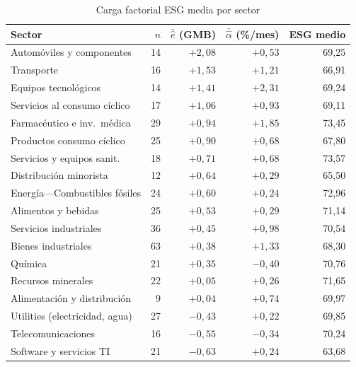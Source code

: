 \documentclass[12pt, a4paper]{article}
\begin{document}
\begin{table}[H]
  \centering
  \caption{Carga factorial ESG media por sector}
  \label{tab:sectores_e}
  \small
  \begin{tabular}{lrrrr}
    \toprule
    Sector & $n$ & $\bar{\hat{e}}$ (GMB) & $\bar{\hat\alpha}$ (\%/mes) & ESG medio \\
    \midrule
    Autom\'oviles y componentes       & 14 & $+2{,}08$ & $+0{,}53$ & 69,25 \\
    Transporte                         & 16 & $+1{,}53$ & $+1{,}21$ & 66,91 \\
    Equipos tecnol\'ogicos             & 14 & $+1{,}41$ & $+2{,}31$ & 69,24 \\
    Servicios al consumo c\'iclico     & 17 & $+1{,}06$ & $+0{,}93$ & 69,11 \\
    Farmac\'eutico e inv.\ m\'edica    & 29 & $+0{,}94$ & $+1{,}85$ & 73,45 \\
    Productos consumo c\'iclico        & 25 & $+0{,}90$ & $+0{,}68$ & 67,80 \\
    Servicios y equipos sanit.         & 18 & $+0{,}71$ & $+0{,}68$ & 73,57 \\
    Distribuci\'on minorista           & 12 & $+0{,}64$ & $+0{,}29$ & 65,50 \\
    Energ\'ia---Combustibles f\'osiles & 24 & $+0{,}60$ & $+0{,}24$ & 72,96 \\
    Alimentos y bebidas                & 25 & $+0{,}53$ & $+0{,}29$ & 71,14 \\
    Servicios industriales             & 36 & $+0{,}45$ & $+0{,}98$ & 70,54 \\
    Bienes industriales                & 63 & $+0{,}38$ & $+1{,}33$ & 68,30 \\
    Qu\'imica                          & 21 & $+0{,}35$ & $-0{,}40$ & 70,76 \\
    Recursos minerales                 & 22 & $+0{,}05$ & $+0{,}26$ & 71,65 \\
    Alimentaci\'on y distribuci\'on    & 9  & $+0{,}04$ & $+0{,}74$ & 69,97 \\
    Utilities (electricidad, agua)     & 27 & $-0{,}43$ & $+0{,}22$ & 69,85 \\
    Telecomunicaciones                 & 16 & $-0{,}55$ & $-0{,}34$ & 70,24 \\
    Software y servicios TI            & 21 & $-0{,}63$ & $+0{,}24$ & 63,68 \\
    \bottomrule
  \end{tabular}
\end{table}
\end{document}
